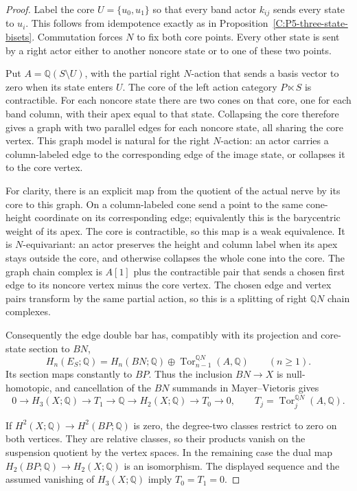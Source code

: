 \begin{proof}
Label the core $U=\{u_0,u_1\}$ so that every band actor
$k_{ij}$ sends every state to $u_i$.  This follows from
idempotence exactly as in Proposition~\ref{C:P5-three-state-bisets}.
Commutation forces $N$ to fix both core points.  Every other
state is sent by a right actor either to another noncore
state or to one of these two points.

Put $A=\mathbb Q(S\setminus U)$, with the partial right
$N$-action that sends a basis vector to zero when its state
enters $U$.  The core of the left action category
$P\ltimes S$ is contractible.  For each noncore state there
are two cones on that core, one for each band column, with
their apex equal to that state.  Collapsing the core therefore
gives a graph with two parallel edges for each noncore state,
all sharing the core vertex.  This graph model is natural
for the right $N$-action: an actor carries a column-labeled
edge to the corresponding edge of the image state, or
collapses it to the core vertex.

For clarity, there is an explicit map from the quotient
of the actual nerve by its core to this graph.  On a
column-labeled cone send a point to the same cone-height
coordinate on its corresponding edge; equivalently this
is the barycentric weight of its apex.  The core is
contractible, so this map is a weak equivalence.  It is
$N$-equivariant: an actor preserves the height and column
label when its apex stays outside the core, and otherwise
collapses the whole cone into the core.  The graph chain complex is
$A[1]$ plus the contractible pair that sends a chosen first
edge to its noncore vertex minus the core vertex.  The
chosen edge and vertex pairs transform by the same partial
action, so this is a splitting of right $\mathbb QN$ chain
complexes.

Consequently the edge double bar has, compatibly with its
projection and core-state section to $BN$,
\[
 H_n(E_S;\mathbb Q)=H_n(BN;\mathbb Q)
       \oplus\operatorname{Tor}_{n-1}^{\mathbb QN}(A,\mathbb Q)
 \qquad(n\geq1).
\]
Its section maps constantly to $BP$.  Thus the inclusion
$BN\to X$ is null-homotopic, and cancellation of the $BN$
summands in Mayer--Vietoris gives
\[
 0\longrightarrow H_3(X;\mathbb Q)
 \longrightarrow T_1\longrightarrow\mathbb Q
 \longrightarrow H_2(X;\mathbb Q)
 \longrightarrow T_0\longrightarrow0,
 \qquad T_j=\operatorname{Tor}^{\mathbb QN}_j(A,\mathbb Q).
\]

If $H^2(X;\mathbb Q)\to H^2(BP;\mathbb Q)$ is zero,
the degree-two classes restrict to zero on both vertices.
They are relative classes, so their products vanish on the
suspension quotient by the vertex spaces.  In the remaining
case the dual map $H_2(BP;\mathbb Q)\to H_2(X;\mathbb Q)$
is an isomorphism.  The displayed sequence and the assumed
vanishing of $H_3(X;\mathbb Q)$ imply $T_0=T_1=0$.


\end{proof}
